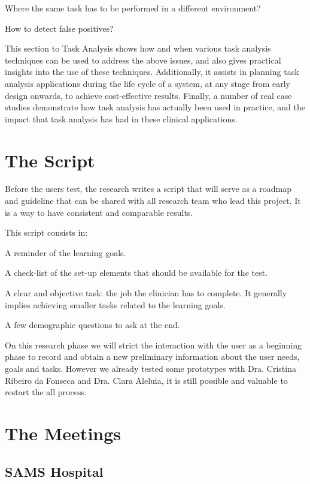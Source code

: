  Where the same task has to be performed in a different environment?

 How to detect false positives?

This section to Task Analysis shows how and when various task analysis techniques can be used to address the above issues, and also gives practical insights into the use of these techniques. Additionally, it assists in planning task analysis applications during the life cycle of a system, at any stage from early design onwards, to achieve cost-effective results. Finally, a number of real case studies demonstrate how task analysis has actually been used in practice, and the impact that task analysis has had in these clinical applications.

\section{The Script}

Before the users test, the research writes a script that will serve as a roadmap and guideline that can be shared with all research team who lead this project. It is a way to have consistent and comparable results.

This script consists in:

 A reminder of the learning goals.

 A check-list of the set-up elements that should be available for the test.

 A clear and objective task: the job the clinician has to complete. It generally implies achieving smaller tasks related to the learning goals.

 A few demographic questions to ask at the end.

On this research phase we will strict the interaction with the user as a beginning phase to record and obtain a new preliminary information about the user needs, goals and tasks. However we already tested some prototypes with Dra. Cristina Ribeiro da Fonseca and Dra. Clara Aleluia, it is still possible and valuable to restart the all process.

\clearpage

\section{The Meetings}

\subsection{SAMS Hospital}

